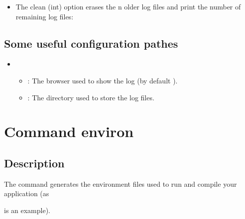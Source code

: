 \documentclass[a4paper,10pt,english]{sphinxmanual}
\begin{document}
\begin{itemize}
%
\begin{sphinxVerbatim}[commandchars=\\\{\}]
   
\end{sphinxVerbatim}

\item {} 
The \textendash{}clean (int) option erases the n older log files and print the number of remaining log files:

%
\begin{sphinxVerbatim}[commandchars=\\\{\}]
    
\end{sphinxVerbatim}

\end{itemize}


\subsection{Some useful configuration pathes}
\label{\detokenize{commands/log:some-useful-configuration-pathes}}\begin{itemize}
\item {} 
\begin{itemize}
\item {} 
 : The browser used to show the log (by default ).

\item {} 
 : The directory used to store the log files.

\end{itemize}

\end{itemize}

\clearpage


\section{Command environ}
\label{\detokenize{commands/environ:svn}}\label{\detokenize{commands/environ:command-environ}}\label{\detokenize{commands/environ::doc}}

\subsection{Description}
\label{\detokenize{commands/environ:description}}
The  command generates the environment files used
to run and compile your application (as %
\begin{footnote}[10]\sphinxAtStartFootnote
{}
%
\end{footnote} is an example).
\end{document}
